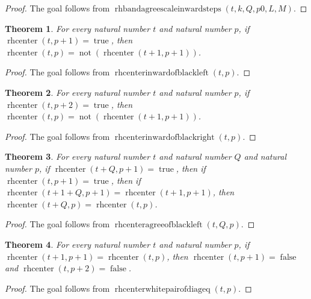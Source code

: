 \documentclass[11pt]{article}
\newtheorem{theorem}{Theorem}[section]
\theoremstyle{definition}
\begin{document}
\begin{proof}
The goal follows from \(\operatorname{rhbandagreescaleinwardsteps}(t, k, Q, p0, L, M)\).
\end{proof}
\begin{theorem}
\label{ll:paper:rhcenter-inward-of-black-left}
For every natural number \(t\) and natural number \(p\), if \(\operatorname{rhcenter}(t, p + 1) = \operatorname{true}\), then \(\operatorname{rhcenter}(t, p) = \operatorname{not}(\operatorname{rhcenter}(t + 1, p + 1))\).
\end{theorem}
\begin{proof}
The goal follows from \(\operatorname{rhcenterinwardofblackleft}(t, p)\).
\end{proof}
\begin{theorem}
\label{ll:paper:rhcenter-inward-of-black-right}
For every natural number \(t\) and natural number \(p\), if \(\operatorname{rhcenter}(t, p + 2) = \operatorname{true}\), then \(\operatorname{rhcenter}(t, p) = \operatorname{not}(\operatorname{rhcenter}(t + 1, p + 1))\).
\end{theorem}
\begin{proof}
The goal follows from \(\operatorname{rhcenterinwardofblackright}(t, p)\).
\end{proof}
\begin{theorem}
\label{ll:paper:rhcenter-agree-of-black-left}
For every natural number \(t\) and natural number \(Q\) and natural number \(p\), if \(\operatorname{rhcenter}(t + Q, p + 1) = \operatorname{true}\), then if \(\operatorname{rhcenter}(t, p + 1) = \operatorname{true}\), then if \(\operatorname{rhcenter}(t + 1 + Q, p + 1) = \operatorname{rhcenter}(t + 1, p + 1)\), then \(\operatorname{rhcenter}(t + Q, p) = \operatorname{rhcenter}(t, p)\).
\end{theorem}
\begin{proof}
The goal follows from \(\operatorname{rhcenteragreeofblackleft}(t, Q, p)\).
\end{proof}
\begin{theorem}
\label{ll:paper:rhcenter-white-pair-of-diag-eq}
For every natural number \(t\) and natural number \(p\), if \(\operatorname{rhcenter}(t + 1, p + 1) = \operatorname{rhcenter}(t, p)\), then \(\operatorname{rhcenter}(t, p + 1) = \operatorname{false}\) and \(\operatorname{rhcenter}(t, p + 2) = \operatorname{false}\).
\end{theorem}
\begin{proof}
The goal follows from \(\operatorname{rhcenterwhitepairofdiageq}(t, p)\).
\end{proof}
\end{document}
